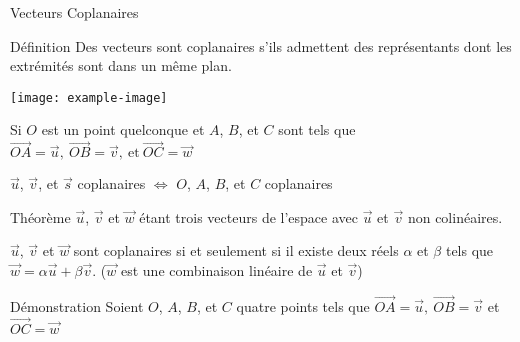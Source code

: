 \documentclass{cours}
\begin{document}
    \begin{Gpartie}{Vecteurs Coplanaires} 
        \begin{Spartie}{Définition} 
            Des vecteurs sont coplanaires s'ils admettent des représentants dont les extrémités sont dans un même plan.
            \begin{center}
                    \texttt{[image: example-image]}
                    \parbox{\linewidth}{}
            \end{center}
            Si $O$ est un point quelconque et $A$, $B$, et $C$ sont tels que $\overrightarrow{OA}=\vec{u},\ \overrightarrow{OB}=\vec{v},\ \text{et}\ \overrightarrow{OC}=\vec{w}$

            $\vec{u}$, $\vec{v}$, et $\vec{s}$ coplanaires $\iff$ $O$, $A$, $B$, et $C$ coplanaires
        \end{Spartie}
        \begin{Spartie}{Théorème} 
            $\vec{u}$, $\vec{v}$ et $\vec{w}$ étant trois vecteurs de l'espace avec $\vec{u}$ et $\vec{v}$ non colinéaires.

            $\vec{u}$, $\vec{v}$ et $\vec{w}$ sont coplanaires si et seulement si il existe deux réels $\alpha$ et $\beta$ tels que $\vec{w}=\alpha\vec{u}+\beta\vec{v}$. \quad($\vec{w}$ est une combinaison linéaire de $\vec{u}$ et $\vec{v}$)
            \pagebreak
            \begin{SSpartie}{Démonstration} 
                Soient $O$, $A$, $B$, et $C$ quatre points tels que $\overrightarrow{OA}=\vec{u},\ \overrightarrow{OB}=\vec{v}$ et $\overrightarrow{OC}=\vec{w}$


\end{SSpartie}
\end{Spartie}
\end{Gpartie}
\end{document}
